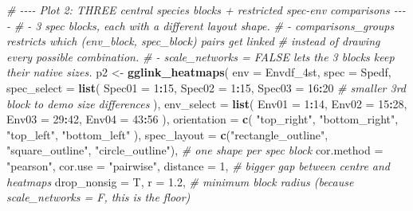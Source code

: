 \documentclass[
]{book}
\newenvironment{Shaded}{\begin{snugshade}}{\end{snugshade}}
\newcommand{\AttributeTok}[1]{\textcolor[rgb]{0.13,0.29,0.53}{#1}}
\newcommand{\CommentTok}[1]{\textcolor[rgb]{0.56,0.35,0.01}{\textit{#1}}}
\newcommand{\DecValTok}[1]{\textcolor[rgb]{0.00,0.00,0.81}{#1}}
\newcommand{\FloatTok}[1]{\textcolor[rgb]{0.00,0.00,0.81}{#1}}
\newcommand{\FunctionTok}[1]{\textcolor[rgb]{0.13,0.29,0.53}{\textbf{#1}}}
\newcommand{\NormalTok}[1]{#1}
\newcommand{\OtherTok}[1]{\textcolor[rgb]{0.56,0.35,0.01}{#1}}
\newcommand{\SpecialCharTok}[1]{\textcolor[rgb]{0.81,0.36,0.00}{\textbf{#1}}}
\newcommand{\StringTok}[1]{\textcolor[rgb]{0.31,0.60,0.02}{#1}}
\begin{document}
\begin{Shaded}
\begin{Highlighting}[]
\CommentTok{\# {-}{-}{-}{-} Plot 2: THREE central species blocks + restricted spec{-}env comparisons {-}{-}{-}{-}}
\CommentTok{\# {-} 3 spec blocks, each with a different layout shape.}
\CommentTok{\# {-} \textasciigrave{}comparisons\_groups\textasciigrave{} restricts which (env\_block, spec\_block) pairs get linked}
\CommentTok{\#   instead of drawing every possible combination.}
\CommentTok{\# {-} \textasciigrave{}scale\_networks = FALSE\textasciigrave{} lets the 3 blocks keep their native sizes.}
\NormalTok{p2 }\OtherTok{\textless{}{-}} \FunctionTok{gglink\_heatmaps}\NormalTok{(}
  \AttributeTok{env                =}\NormalTok{ Envdf\_4st,}
  \AttributeTok{spec               =}\NormalTok{ Spedf,}
  \AttributeTok{spec\_select        =} \FunctionTok{list}\NormalTok{(}
    \AttributeTok{Spec01 =} \DecValTok{1}\SpecialCharTok{:}\DecValTok{15}\NormalTok{,}
    \AttributeTok{Spec02 =} \DecValTok{1}\SpecialCharTok{:}\DecValTok{15}\NormalTok{,}
    \AttributeTok{Spec03 =} \DecValTok{16}\SpecialCharTok{:}\DecValTok{20}                       \CommentTok{\# smaller 3rd block to demo size differences}
\NormalTok{  ),}
  \AttributeTok{env\_select         =} \FunctionTok{list}\NormalTok{(}
    \AttributeTok{Env01 =} \DecValTok{1}\SpecialCharTok{:}\DecValTok{14}\NormalTok{,}
    \AttributeTok{Env02 =} \DecValTok{15}\SpecialCharTok{:}\DecValTok{28}\NormalTok{,}
    \AttributeTok{Env03 =} \DecValTok{29}\SpecialCharTok{:}\DecValTok{42}\NormalTok{,}
    \AttributeTok{Env04 =} \DecValTok{43}\SpecialCharTok{:}\DecValTok{56}
\NormalTok{  ),}
  \AttributeTok{orientation        =} \FunctionTok{c}\NormalTok{(}
    \StringTok{"top\_right"}\NormalTok{,}
    \StringTok{"bottom\_right"}\NormalTok{,}
    \StringTok{"top\_left"}\NormalTok{,}
    \StringTok{"bottom\_left"}
\NormalTok{  ),}
  \AttributeTok{spec\_layout        =} \FunctionTok{c}\NormalTok{(}\StringTok{"rectangle\_outline"}\NormalTok{, }\StringTok{"square\_outline"}\NormalTok{, }\StringTok{"circle\_outline"}\NormalTok{),  }\CommentTok{\# one shape per spec block}
  \AttributeTok{cor.method         =} \StringTok{"pearson"}\NormalTok{,}
  \AttributeTok{cor.use            =} \StringTok{"pairwise"}\NormalTok{,}
  \AttributeTok{distance           =} \DecValTok{1}\NormalTok{,                }\CommentTok{\# bigger gap between centre and heatmaps}
  \AttributeTok{drop\_nonsig        =}\NormalTok{ T,}
  \AttributeTok{r                  =} \FloatTok{1.2}\NormalTok{,              }\CommentTok{\# minimum block radius (because scale\_networks = F, this is the floor)}

\end{Highlighting}
\end{Shaded}
\end{document}
